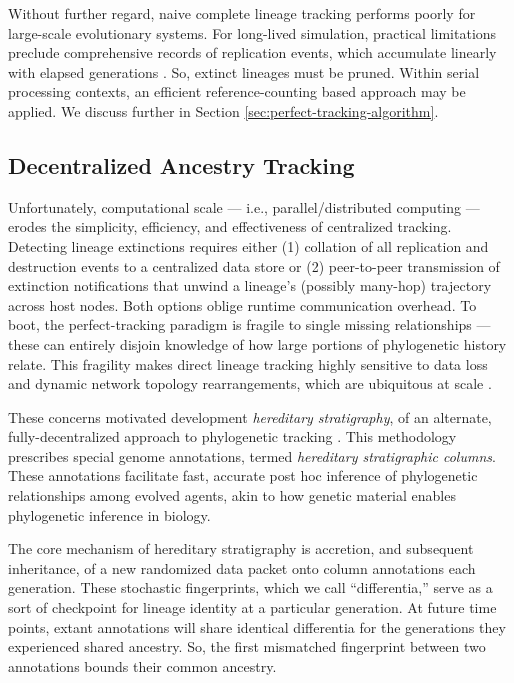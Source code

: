 Without further regard, naive complete lineage tracking performs poorly for large-scale evolutionary systems.
For long-lived simulation, practical limitations preclude comprehensive records of replication events, which accumulate linearly with elapsed generations \citep{dolson2023algorithms}.
So, extinct lineages must be pruned.
Within serial processing contexts, an efficient reference-counting based approach may be applied.
We discuss further in Section \ref{sec:perfect-tracking-algorithm}.

\subsection{Decentralized Ancestry Tracking}

Unfortunately, computational scale --- i.e., parallel/distributed computing --- erodes the simplicity, efficiency, and effectiveness of centralized tracking.
Detecting lineage extinctions requires either (1) collation of all replication and destruction events to a centralized data store or (2) peer-to-peer transmission of extinction notifications that unwind a lineage's (possibly many-hop) trajectory across host nodes.
Both options oblige runtime communication overhead.
To boot, the perfect-tracking paradigm is fragile to single missing relationships --- these can entirely disjoin knowledge of how large portions of phylogenetic history relate.
This fragility makes direct lineage tracking highly sensitive to data loss and dynamic network topology rearrangements, which are ubiquitous at scale \citep{cappello2014toward,ackley2011pursue}.

These concerns motivated development \textit{hereditary stratigraphy}, of an alternate, fully-decentralized approach to phylogenetic tracking \citep{moreno2022hereditary}.
This methodology prescribes special genome annotations, termed \textit{hereditary stratigraphic columns}.
These annotations facilitate fast, accurate post hoc inference of phylogenetic relationships among evolved agents, akin to how genetic material enables phylogenetic inference in biology.

The core mechanism of hereditary stratigraphy is accretion, and subsequent inheritance, of a new randomized data packet onto column annotations each generation.
These stochastic fingerprints, which we call ``differentia,'' serve as a sort of checkpoint for lineage identity at a particular generation.
At future time points, extant annotations will share identical differentia for the generations they experienced shared ancestry.
So, the first mismatched fingerprint between two annotations bounds their common ancestry.

